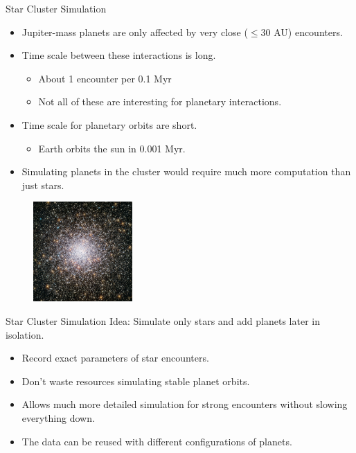 \documentclass{beamer}
\begin{document}
\begin{frame}{Star Cluster Simulation}
    \begin{itemize}
        \item Jupiter-mass planets are only affected by very close ($\le $30 AU) encounters.
        \item Time scale between these interactions is long.
            \begin{itemize}
                \item About 1 encounter per 0.1 Myr
                \item Not all of these are interesting for planetary interactions.
            \end{itemize}
        \item Time scale for planetary orbits are short.
            \begin{itemize}
                \item Earth orbits the sun in 0.001 Myr.
            \end{itemize}
        \item Simulating planets in the cluster would require much more
            computation than just stars.
    \end{itemize}
    \begin{figure}
        \includegraphics[height=1.5in]{star_cluster.jpg}
    \end{figure}
\end{frame}

\begin{frame}{Star Cluster Simulation}
    Idea: Simulate only stars and add planets later in isolation.
    \begin{itemize}
        \item Record exact parameters of star encounters.
        \item Don't waste resources simulating stable planet orbits.
        \item Allows much more detailed simulation for strong encounters
            without slowing everything down.
        \item The data can be reused with different configurations of planets.
    \end{itemize}
\end{frame}
\end{document}
